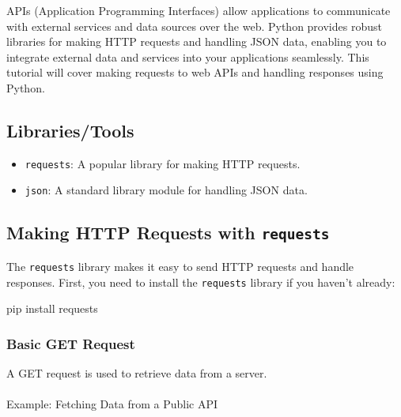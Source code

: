 \documentclass[
  letterpaper,
  DIV=11,
  numbers=noendperiod]{scrreprt}
\makeatletter
\let\oldparagraph\paragraph
\renewcommand{\paragraph}{
    \@ifstar
      \xxxParagraphStar
      \xxxParagraphNoStar
  }
\newcommand{\xxxParagraphStar}[1]{\oldparagraph*{#1}\mbox{}}
\newcommand{\xxxParagraphNoStar}[1]{\oldparagraph{#1}\mbox{}}
\newenvironment{Shaded}{\begin{snugshade}}{\end{snugshade}}
\newcommand{\ExtensionTok}[1]{\textcolor[rgb]{0.00,0.23,0.31}{#1}}
\newcommand{\NormalTok}[1]{\textcolor[rgb]{0.00,0.23,0.31}{#1}}
\providecommand{\tightlist}{%
  \setlength{\itemsep}{0pt}\setlength{\parskip}{0pt}}\usepackage{longtable,booktabs,array}
\makeatother
\begin{document}
APIs (Application Programming Interfaces) allow applications to
communicate with external services and data sources over the web. Python
provides robust libraries for making HTTP requests and handling JSON
data, enabling you to integrate external data and services into your
applications seamlessly. This tutorial will cover making requests to web
APIs and handling responses using Python.

\subsection{Libraries/Tools}\label{librariestools}

\begin{itemize}
\tightlist
\item
  \texttt{requests}: A popular library for making HTTP requests.
\item
  \texttt{json}: A standard library module for handling JSON data.
\end{itemize}

\subsection{\texorpdfstring{Making HTTP Requests with
\texttt{requests}}{Making HTTP Requests with requests}}\label{making-http-requests-with-requests}

The \texttt{requests} library makes it easy to send HTTP requests and
handle responses. First, you need to install the \texttt{requests}
library if you haven't already:

\begin{Shaded}
\begin{Highlighting}[]
\ExtensionTok{pip}\NormalTok{ install requests}
\end{Highlighting}
\end{Shaded}

\subsubsection{Basic GET Request}\label{basic-get-request}

A GET request is used to retrieve data from a server.

\paragraph{Example: Fetching Data from a Public
API}\label{example-fetching-data-from-a-public-api}
\end{document}

